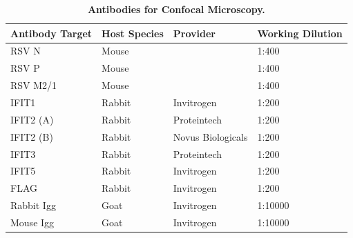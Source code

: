 \begin{table}
\centering
\begin{tabular}{llll}
\toprule
\textbf{Antibody Target} & \textbf{Host Species} & \textbf{Provider} & \textbf{Working Dilution} \\ \midrule
RSV N       & Mouse  & \cite{Taylor1992ProtectiveAntibodies.}             & 1:400   \\
RSV P       & Mouse  & \cite{Taylor1992ProtectiveAntibodies.}              & 1:400   \\
RSV   M2/1  & Mouse  & \cite{Taylor1992ProtectiveAntibodies.}              & 1:400   \\
IFIT1       & Rabbit & Invitrogen        & 1:200   \\
IFIT2   (A) & Rabbit & Proteintech       & 1:200   \\
IFIT2 (B)   & Rabbit & Novus Biologicals & 1:200   \\
IFIT3       & Rabbit & Proteintech       & 1:200   \\
IFIT5       & Rabbit & Invitrogen              & 1:200   \\
FLAG        & Rabbit & Invitrogen              & 1:200   \\
Rabbit Igg  & Goat   & Invitrogen              & 1:10000 \\
Mouse   Igg & Goat   & Invitrogen              & 1:10000 \\ \bottomrule
\end{tabular}
\caption[Antibodies for Confocal Microscopy.]{\textbf{Antibodies for Confocal Microscopy.}}
\label{tab:Antibodies for Confocal Microscopy}
\end{table}

